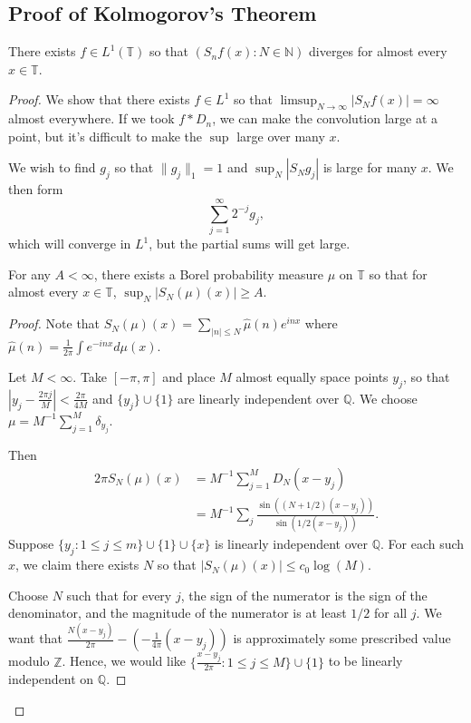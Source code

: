 \documentclass[11pt]{scrartcl}
\newcommand{\N}{\mathbb{N}}
\newcommand{\Z}{\mathbb{Z}}
\newcommand{\Q}{\mathbb{Q}}
\newcommand{\T}{\mathbb T}
\let \hat \widehat
\newcommand{\<}{\langle}
\renewcommand{\>}{\rangle}
\begin{document}
\subsection{Proof of Kolmogorov's Theorem}
\begin{thm}[Kolmogorov] There exists $f \in L^1(\T)$ so that $(S_nf(x): N \in \N)$ diverges for almost every $x \in \T$.
\end{thm}
\begin{proof}
We show that there exists $f \in L^1$ so that $\limsup_{N \rightarrow \infty} |S_N f(x)| = \infty$ almost everywhere.  If we took $f*D_n$, we can make the convolution large at a point, but it's difficult to make the $\sup$ large over many $x$.  

We wish to find $g_j$ so that $\|g_j\|_1 = 1$ and $\sup_{N} |S_Ng_j|$ is large for many $x$.  We then form 
$$\sum_{j=1}^{\infty}2^{-j} g_j,$$
which will converge in $L^1$, but the partial sums will get large.  

\begin{lemma} For any $A < \infty$, there exists a Borel probability measure $\mu$ on $\T$ so that for almost every $x \in \T$, $\sup_{N} |S_N(\mu)(x)| \ge A$.
\end{lemma}
\begin{proof}
Note that $S_N(\mu)(x) = \sum_{|n| \le N} \hat{\mu}(n)e^{inx}$ where $\hat{\mu}(n) = \frac{1}{2\pi} \int e^{-inx}d\mu(x).$ 

Let $M < \infty$.  Take $[-\pi, \pi]$ and place $M$ almost equally space points $y_j$, so that $|y_j - \frac{2\pi j}{M}| < \frac{2\pi}{4M}$ and $\{y_j\} \cup \{1\}$ are linearly independent over $\Q$.  We choose $\mu = M^{-1}\sum_{j=1}^M \delta_{y_j}.$

Then 
\begin{align*}
2\pi S_N(\mu)(x) &= M^{-1} \sum_{j=1}^M D_N(x-y_j) \\
&= M^{-1} \sum_{j}  \frac{\sin((N+1/2)(x-y_j))}{\sin(1/2(x-y_j))}.
\end{align*}
Suppose $\{y_j: 1 \le j \le m\} \cup \{1\} \cup \{x\}$ is linearly independent over $\Q$.  For each such $x$, we claim there exists $N$ so that $|S_N(\mu)(x)| \le c_0\log (M).$

Choose $N$ such that for every $j$, the sign of the numerator is the sign of the denominator, and the magnitude of the numerator is at least $1/2$ for all $j$.  We want that $\frac{N(x-y_j)}{2\pi} - (-\frac{1}{4\pi}(x-y_j))$ is approximately some prescribed value modulo $\Z$.  Hence, we would like $\{\frac{x-y_j}{2\pi} : 1 \le j \le M\}\cup \{1\}$ to be linearly independent on $\Q$.


\end{proof}
\end{proof}
\end{document}
